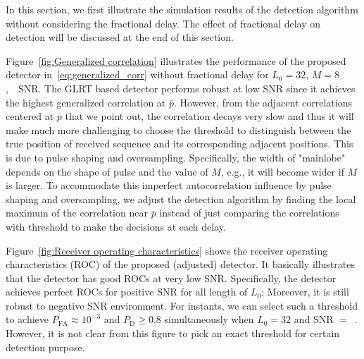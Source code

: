 In this section, we first illustrate the simulation results of the detection algorithm without considering the fractional delay.
The effect of fractional delay on detection will be discussed at the end of this section. 

Figure~\ref{fig:Generalized correlation} illustrates the performance of the proposed detector in~\eqref{eq:generalized_corr} without fractional delay for 
$L_0=32$, $M=8$,~\dB~SNR. The GLRT based detector performs robust at low SNR since it achieves the highest generalized correlation at $\bar{p}$.
However, from the adjacent correlations centered at $\bar{p}$ that we point out,
the correlation decays very slow and thus it will make much more challenging to choose the threshold to distinguish between 
the true position of received sequence and its corresponding adjacent positions. This is due to pulse shaping and oversampling. Specifically,
the width of "mainlobe" depends on the shape of pulse and the value of $M$, e.g., 
it will become wider if $M$ is larger. 
To accommodate this imperfect autocorrelation influence by pulse shaping and oversampling, we adjust the detection algorithm by finding the local maximum of the correlation near $\bar{p}$ instead of
just comparing the correlations with threshold to make the decisions at each delay. 

Figure~\ref{fig:Receiver operating characteristics} shows the receiver operating characteristics (ROC) of the proposed (adjusted) detector.
It basically illustrates that the detector has good ROCs at very low SNR. Specifically, the detector achieves perfect ROCs for positive SNR for all length of $L_0$; 
Moreover, it is still robust to negative SNR environment. For instants, we can select such a threshold to achieve  
$P_{\text{FA}} \approx 10^{-3}$ and $P_{\text{D}} \geq 0.8$ simultaneously when $L_0=32$ and SNR $=$~\dB.
However, it is not clear from this figure to pick an exact threshold for certain detection purpose.

